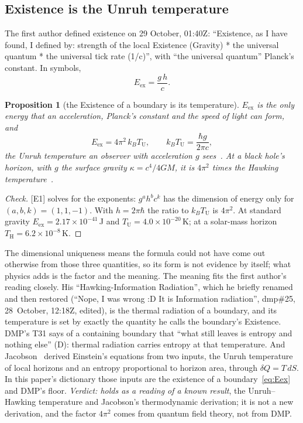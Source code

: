 \documentclass[11pt,a4paper]{article}
\newtheorem{proposition}{Proposition}
\theoremstyle{definition}
\theoremstyle{remark}
\newcommand{\chk}[1]{\textsf{[#1]}}
\newcommand{\tagD}{\textsf{(D)}}
\begin{document}
\subsection{Existence is the Unruh temperature}\label{sec:unruh}

The first author defined existence on 29 October, 01:40Z: ``Existence, as I have found, I defined by: strength of the local Existence
(Gravity) * the universal quantum * the universal tick rate (1/c)'', with ``the universal quantum'' Planck's constant. In symbols,
\begin{equation}\label{eq:Eex}
E_{\text{ex}}=\frac{g\,h}{c}.
\end{equation}
\begin{proposition}[the Existence of a boundary is its temperature]\label{pr:unruh}
$E_{\text{ex}}$ is the only energy that an acceleration, Planck's constant and the speed of light can form, and
\[
E_{\text{ex}}=4\pi^2\,k_BT_{\text{U}},\qquad k_BT_{\text{U}}=\frac{\hbar g}{2\pi c},
\]
the Unruh temperature an observer with acceleration $g$ sees~\cite{unruh}. At a black hole's horizon, with $g$ the surface gravity
$\kappa=c^4/4GM$, it is $4\pi^2$ times the Hawking temperature~\cite{hawking}.
\end{proposition}

\begin{proof}[Check]
\chk{E1} solves for the exponents: $g^a h^b c^k$ has the dimension of energy only for $(a,b,k)=(1,1,-1)$. With $h=2\pi\hbar$ the ratio
to $k_BT_{\text{U}}$ is $4\pi^2$. At standard gravity $E_{\text{ex}}=2.17\times10^{-41}$\,J and $T_{\text{U}}=4.0\times10^{-20}$\,K; at
a solar-mass horizon $T_{\text{H}}=6.2\times10^{-8}$\,K.
\end{proof}

\noindent The dimensional uniqueness means the formula could not have come out otherwise from those three quantities, so its form is not
evidence by itself; what physics adds is the factor and the meaning. The meaning fits the first author's reading closely. His ``Hawking-Information
Radiation'', which he briefly renamed and then restored (``Nope, I was wrong :D It is Information radiation'', dmp\#25, 28~October,
12:18Z, edited), is the thermal radiation of a boundary, and its temperature is set by exactly the quantity he calls the boundary's
Existence. DMP's T31 says of a containing boundary that ``what still leaves is entropy and nothing else'' \tagD: thermal radiation carries
entropy at that temperature. And Jacobson~\cite{jacobson} derived Einstein's equations from two inputs, the Unruh temperature of local
horizons and an entropy proportional to horizon area, through $\delta Q=T\,dS$. In this paper's dictionary those inputs are the
existence of a boundary~\eqref{eq:Eex} and DMP's floor. \emph{Verdict: holds as a reading of a known result}, the Unruh--Hawking
temperature and Jacobson's thermodynamic derivation; it is not a new derivation, and the factor $4\pi^2$ comes from quantum field theory,
not from DMP.
\end{document}
